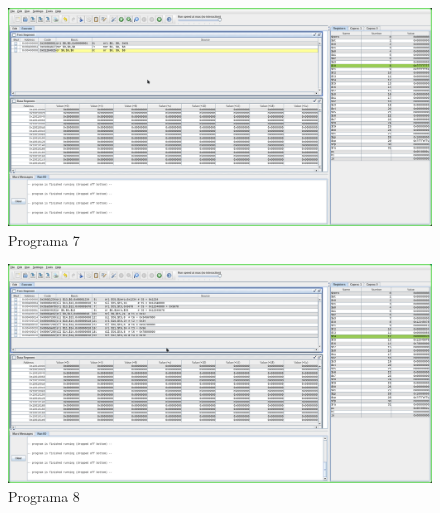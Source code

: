 \documentclass[a4paper,11pt]{article}
\begin{document}
\begin{figure}[!ht]
    \caption{Programa 7}
    \centering
    \includegraphics[width=1\textwidth]{programa7}
\end{figure} 
\begin{figure}[!ht]
    \caption{Programa 8}
    \centering
    \includegraphics[width=1\textwidth]{programa8}
\end{figure}  
\end{document}
